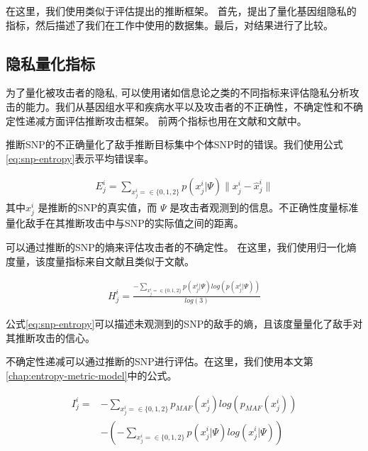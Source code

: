 在这里，我们使用类似于\cite{humbert2013addressing,deznabi2018inference}评估提出的推断框架。 首先，提出了量化基因组隐私的指标，然后描述了我们在工作中使用的数据集。最后，对结果进行了比较。

\subsection{隐私量化指标}

为了量化被攻击者的隐私, 可以使用诸如信息论之类的不同指标来评估隐私分析攻击的能力\cite{marchini2007newa,shokri2011quantifying,serjantov2002towards}。我们从基因组水平和疾病水平以及攻击者的不正确性，不确定性和不确定性递减方面评估推断攻击框架。 前两个指标也用在文献\cite{humbert2013addressing}和文献\cite{deznabi2018inference}中。

推断SNP的不正确量化了敌手推断目标集中个体SNP时的错误。我们使用公式\ref{eq:snp-entropy}表示平均错误率。

\begin{equation}
\begin{aligned}\label{eq:snp-error-rate}
E^i_j=\sum_{x^i_j=\in \{0,1,2\}}{p(x^i_j|\Psi)\|x^i_j - \hat{x}^i_j\|}
\end{aligned}
\end{equation}
其中$x^i_j$ 是推断的SNP的真实值，而 $\Psi$ 是攻击者观测到的信息。不正确性度量标准量化敌手在其推断攻击中与SNP的实际值之间的距离。

可以通过推断的SNP的熵来评估攻击者的不确定性。 在这里，我们使用归一化熵度量，该度量指标来自文献\cite{humbert2013addressing}且类似于文献\cite{deznabi2018inference}。

\begin{equation}
\begin{aligned}\label{eq:snp-entropy}
H^i_j=
\frac{-\sum_{x^i_j=\in \{0,1,2\}}{p(x^i_j|\Psi)log(p(x^i_j|\Psi))}}{log(3)}
\end{aligned}
\end{equation}

公式\ref{eq:snp-entropy}可以描述未观测到的SNP的敌手的熵，且该度量量化了敌手对其推断攻击的信心。

不确定性递减可以通过推断的SNP进行评估。在这里，我们使用本文第\ref{chap:entropy-metric-model}中的公式。

\begin{equation}\label{eq:snp-mutual-information}
\begin{aligned}
I^i_j=& -\sum_{x^i_j=\in \{0,1,2\}}p_{MAF}(x^i_j)log(p_{MAF}(x^i_j))  \nonumber \\
& - (-\sum_{x^i_j=\in \{0,1,2\}}{p(x^i_j|\Psi)log(x^i_j|\Psi)})
\end{aligned}
\end{equation}


